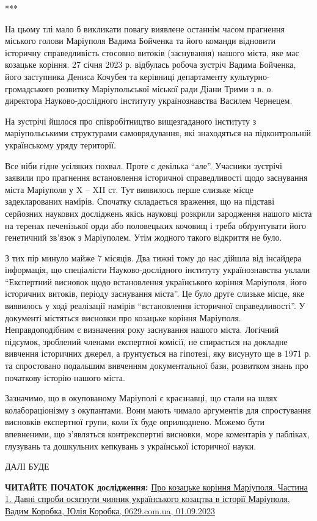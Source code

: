 ***

На цьому тлі мало б викликати повагу виявлене останнім часом прагнення міського
голови Маріуполя Вадима Бойченка та його команди відновити історичну
справедливість стосовно витоків (заснування) нашого міста, яке має козацьке
коріння. 27 січня 2023 р. відбулась  робоча зустріч Вадима Бойченка, його
заступника Дениса Кочубея та керівниці департаменту культурно-громадського
розвитку Маріупольської міської ради Діани Трими з в. о. директора
Науково-дослідного інституту українознавства Василем Чернецем.


На зустрічі йшлося про співробітництво  вищезгаданого інституту з
маріупольськими структурами самоврядування, які знаходяться на підконтрольній
українському уряду території. 

Все ніби гідне усіляких похвал. Проте є декілька \enquote{але}. Учасники зустрічі
заявили про прагнення встановлення історичної справедливості щодо заснування
міста Маріуполя у X – XII ст. Тут виявилось перше слизьке місце задекларованих
намірів. Спочатку складається враження, що на підставі серйозних наукових
досліджень якісь науковці розкрили зародження нашого міста на теренах
печенізької орди або половецьких кочовищ і треба обґрунтувати його генетичний
зв'язок з Маріуполем. Утім жодного такого відкриття не було. 

З тих пір минуло майже 7 місяців. Два тижні тому до нас дійшла від інсайдера
інформація, що спеціалісти Науково-дослідного інституту українознавства уклали
\enquote{Експертний висновок щодо встановлення українського коріння Маріуполя, його
історичних витоків, періоду заснування міста}. Це було друге слизьке місце, яке
виявилось у ході реалізації намірів \enquote{встановлення історичної справедливості}. У
документі містяться висновки про козацьке коріння Маріуполя.  Неправдоподібним
є визначення року заснування нашого міста. Логічний підсумок, зроблений членами
експертної комісії, не спирається на докладне вивчення історичних джерел, а
ґрунтується на гіпотезі, яку висунуто ще в 1971 р. та спростовано подальшим
вивченням документальної бази, розвитком знань про початкову історію нашого
міста.

Зазначимо, що в окупованому Маріуполі є краєзнавці, що стали на шлях
колабораціонізму з окупантами. Вони мають чимало аргументів для спростування
висновків експертної групи, коли їх буде оприлюднено. Можемо бути впевненими,
що з’являться контрекспертні висновки, море коментарів у пабліках, глузувань та
дошкульних кепкувань з  української історичної науки.

ДАЛІ БУДЕ

\textbf{ЧИТАЙТЕ ПОЧАТОК дослідження:} \href{https://www.0629.com.ua/news/3653256/pro-kozacke-korinna-mariupola-castina-1-davni-sprobi-osagnuti-cinnik-ukrainskogo-kozactva-v-istorii-mariupola}{%
Про козацьке коріння Маріуполя. Частина 1. Давні спроби осягнути чинник українського козацтва в історії Маріуполя, Вадим Коробка, Юлія Коробка, 0629.com.ua, 01.09.2023}
